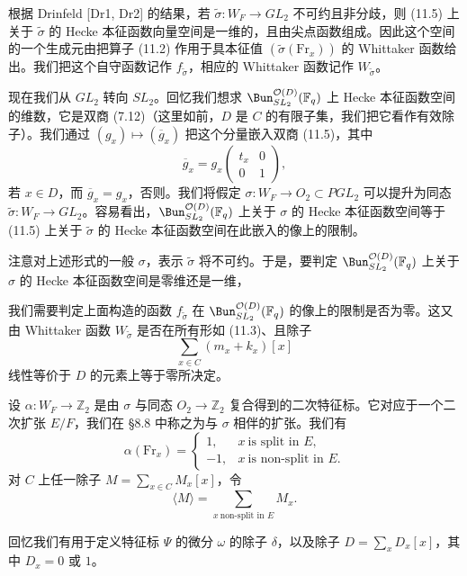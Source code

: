 根据 Drinfeld [Dr1, Dr2] 的结果，若 $\tilde\sigma: W_F\to GL_2$ 不可约且非分歧，则 (11.5) 上关于 $\tilde\sigma$ 的 Hecke 本征函数向量空间是一维的，且由尖点函数组成。因此这个空间的一个生成元由把算子 (11.2) 作用于具本征值 $(\tilde\sigma(\mathrm{Fr}_x))$ 的 Whittaker 函数给出。我们把这个自守函数记作 $f_{\tilde\sigma}$，相应的 Whittaker 函数记作 $W_{\tilde\sigma}$。

现在我们从 $GL_2$ 转向 $SL_2$。回忆我们想求 $\Bun^{\mathcal{O}(D)}_{SL_2}(\mathbb{F}_q)$ 上 Hecke 本征函数空间的维数，它是双商 (7.12)（这里如前，$D$ 是 $C$ 的有限子集，我们把它看作有效除子）。我们通过 $(g_x)\mapsto(\overline{g}_x)$ 把这个分量嵌入双商 (11.5)，其中
\[
\overline{g}_x = g_x\begin{pmatrix}t_x&0\\ 0&1\end{pmatrix},
\]
若 $x\in D$，而 $\overline{g}_x=g_x$，否则。我们将假定 $\sigma: W_F\to O_2\subset PGL_2$ 可以提升为同态 $\tilde\sigma: W_F\to GL_2$。容易看出，$\Bun^{\mathcal{O}(D)}_{SL_2}(\mathbb{F}_q)$ 上关于 $\sigma$ 的 Hecke 本征函数空间等于 (11.5) 上关于 $\tilde\sigma$ 的 Hecke 本征函数空间在此嵌入的像上的限制。

注意对上述形式的一般 $\sigma$，表示 $\tilde\sigma$ 将不可约。于是，要判定 $\Bun^{\mathcal{O}(D)}_{SL_2}(\mathbb{F}_q)$ 上关于 $\sigma$ 的 Hecke 本征函数空间是零维还是一维，


我们需要判定上面构造的函数 $f_{\tilde\sigma}$ 在 $\Bun^{\mathcal{O}(D)}_{SL_2}(\mathbb{F}_q)$ 的像上的限制是否为零。这又由 Whittaker 函数 $W_{\tilde\sigma}$ 是否在所有形如 (11.3)、且除子
\[
\sum_{x\in C}(m_x+k_x)[x]
\]
线性等价于 $D$ 的元素上等于零所决定。

设 $\alpha: W_F\to\mathbb{Z}_2$ 是由 $\sigma$ 与同态 $O_2\to\mathbb{Z}_2$ 复合得到的二次特征标。它对应于一个二次扩张 $E/F$，我们在 §8.8 中称之为与 $\sigma$ 相伴的扩张。我们有
\[
\alpha(\mathrm{Fr}_x)=\begin{cases}1,&x\ \text{is split in }E,\\ -1,&x\ \text{is non-split in }E.\end{cases}
\]
对 $C$ 上任一除子 $M=\sum_{x\in C}M_x[x]$，令
\[
\langle M\rangle = \sum_{x\ \text{non-split in }E}M_x.
\]

回忆我们有用于定义特征标 $\Psi$ 的微分 $\omega$ 的除子 $\delta$，以及除子 $D=\sum_x D_x[x]$，其中 $D_x=0$ 或 $1$。

